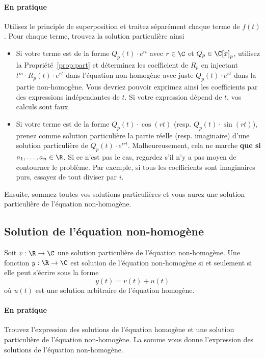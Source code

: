 \paragraph{En pratique}
Utilisez le principle de superposition et traitez séparément chaque terme de $f(t)$.
Pour chaque terme, trouvez la solution particulière ainsi
\begin{itemize}
	\item Si votre terme est de la forme $Q_p(t) \cdot e^{rt}$ avec $r \in \C$ et $Q_p \in \C[x]_p$,
		utilisez la Propriété~\ref{prop:part} et déterminez les coefficient de $R_p$ en injectant
		$t^m \cdot R_p(t) \cdot e^{rt}$ dans l'équation non-homogène avec juste $Q_p(t) \cdot e^{rt}$
		dans la partie non-homogène.
		Vous devriez pouvoir exprimez ainsi les coefficients par des expressions indépendantes de $t$.
		Si votre expression dépend de $t$, vos calculs sont faux.
	\item Si votre terme est de la forme $Q_p(t) \cdot \cos(rt)$ (resp. $Q_p(t) \cdot \sin(rt)$),
		prenez comme solution particulière la partie réelle (resp. imaginaire) d'une solution particulière de
		$Q_p(t) \cdot e^{irt}$.
		Malheureusement, cela ne marche \textbf{que si $a_1, \dots, a_n \in \R$}.
		Si ce n'est pas le cas, regardez s'il n'y a pas moyen de contourner le problème.
		Par exemple, si tous les coefficients sont imaginaires purs, essayez de tout diviser par $i$.
\end{itemize}
Ensuite, sommez toutes vos solutions particulières et vous aurez une solution particulière de l'équation non-homogène.

\subsection{Solution de l'équation non-homogène}
\begin{mytheo}
	Soit $v: \R \to \C$ une solution particulière de l'équation non-homogène.
	Une fonction $y: \R \to \C$ est solution de l'équation non-homogène si et seulement si elle peut s'écrire sous la forme
	\[ y(t) = v(t) + u(t) \]
	où $u(t)$ est une solution arbitraire de l'équation homogène.
\end{mytheo}

\paragraph{En pratique}
Trouvez l'expression des solutions de l'équation homogène et une solution particulière de l'équation non-homogène.
La somme vous donne l'expression des solutions de l'équation non-homogène.

